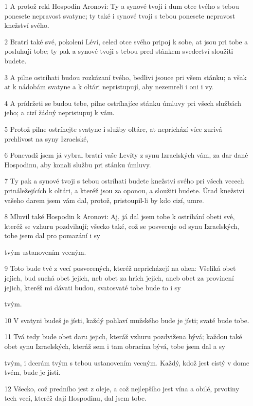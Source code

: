 \par 1 A protož rekl Hospodin Aronovi: Ty a synové tvoji i dum otce tvého s tebou ponesete nepravost svatyne; ty také i synové tvoji s tebou ponesete nepravost knežství svého.
\par 2 Bratrí také své, pokolení Léví, celed otce svého pripoj k sobe, at jsou pri tobe a posluhují tobe; ty pak a synové tvoji s tebou pred stánkem svedectví sloužiti budete.
\par 3 A pilne ostríhati budou rozkázaní tvého, bedlivi jsouce pri všem stánku; a však at k nádobám svatyne a k oltári nepristupují, aby nezemreli i oni i vy.
\par 4 A prídržeti se budou tebe, pilne ostríhajíce stánku úmluvy pri všech službách jeho; a cizí žádný nepristupuj k vám.
\par 5 Protož pilne ostríhejte svatyne i služby oltáre, at neprichází více zurivá prchlivost na syny Izraelské,
\par 6 Ponevadž jsem já vybral bratrí vaše Levíty z synu Izraelských vám, za dar dané Hospodinu, aby konali službu pri stánku úmluvy.
\par 7 Ty pak a synové tvoji s tebou ostríhati budete knežství svého pri všech vecech prináležejících k oltári, a kteréž jsou za oponou, a sloužiti budete. Úrad knežství vašeho darem jsem vám dal, protož, pristoupil-li by kdo cizí, umre.
\par 8 Mluvil také Hospodin k Aronovi: Aj, já dal jsem tobe k ostríhání obeti své, kteréž se vzhuru pozdvihují; všecko také, což se posvecuje od synu Izraelských, tobe jsem dal pro pomazání i sy\par tvým ustanovením vecným.
\par 9 Toto bude tvé z vecí posvecených, kteréž nepricházejí na ohen: Všeliká obet jejich, bud suchá obet jejich, neb obet za hrích jejich, aneb obet za provinení jejich, kteréž mi dávati budou, svatosvaté tobe bude to i sy\par tvým.
\par 10 V svatyni budeš je jísti, každý pohlaví mužského bude je jísti; svaté bude tobe.
\par 11 Tvá tedy bude obet daru jejich, kteráž vzhuru pozdvižena bývá; každou také obet synu Izraelských, kteráž sem i tam obracína bývá, tobe jsem dal a sy\par tvým, i dcerám tvým s tebou ustanovením vecným. Každý, kdož jest cistý v dome tvém, bude je jísti.
\par 12 Všecko, což predního jest z oleje, a což nejlepšího jest vína a obilé, prvotiny tech vecí, kteréž dají Hospodinu, dal jsem tobe.

